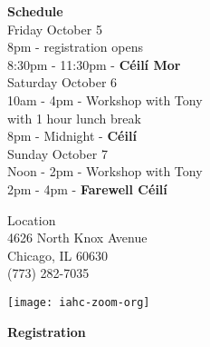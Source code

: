 \documentclass[12pt,
notumble,
letterpaper]{leaflet}
\begin{document}
\begin{flushleft}
{\large \textbf{Schedule}}\\ 
\vspace*{2em}
Friday October 5\\
\hspace*{3em}  8pm  - registration opens\\
\hspace*{3em}  8:30pm  - 11:30pm  - \textbf{C\'{e}il\'{i} Mor}\\

Saturday October 6\\
\hspace*{3em}  10am - 4pm  - Workshop with Tony\\
\hspace*{3em}  {\small with 1 hour lunch break}\\

\hspace*{3em}  8pm - Midnight - \textbf{C\'{e}il\'{i}}\\

Sunday October 7\\
\hspace*{3em}  Noon - 2pm  - Workshop  with Tony \\

 \hspace*{3em} 2pm - 4pm - \textbf{Farewell C\'{e}il\'{i}}\\
\end{flushleft}

Location\\
4626 North Knox Avenue\\
Chicago, IL 60630\\
(773) 282-7035
%

\vspace*{0.05em}
\begin{center}
\texttt{[image: iahc-zoom-org]}
\end{center}

\pagebreak
\begin{flushleft}
{\Large \textbf{Registration}}
\end{flushleft}
\end{document}
